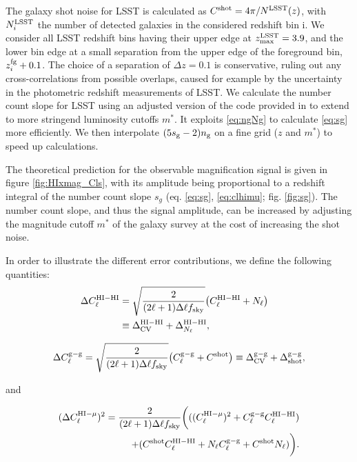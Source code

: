 \documentclass[useAMS,usenatbib]{mnras}
\newcommand{\be}{\begin{equation}}
\newcommand{\ee}{\end{equation}}
\begin{document}
The galaxy shot noise for LSST is calculated as $C^\mathrm{shot} = 4\pi/N^{\rm LSST}(z)$, with $N^{\rm LSST}_i$ the number of detected galaxies in the considered redshift bin i. We consider all LSST redshift bins having their upper edge at $z_{\rm max}^{\rm LSST} = 3.9$, and the lower bin edge at a small separation from the upper edge of the foreground bin, $z^{\rm fg}_i + 0.1$. The choice of a separation of $\Delta z = 0.1$ is conservative, ruling out any cross-correlations from possible overlaps, caused for example by the uncertainty in the photometric redshift measurements of LSST. We calculate the number count slope for LSST using an adjusted version of the code provided in \cite{0004-637X-814-2-145} to extend to more stringend luminosity cutoffs $m^*$. It exploits \ref{eq:ngNg} to calculate \ref{eq:sg} more efficiently.
We then interpolate $(5s_{\rm g}-2)n_{\rm g}$ on a fine grid ($z$ and $m^*$) to speed up calculations.


The theoretical prediction for the observable magnification signal is given in figure \ref{fig:HIxmag_Cls}, with its amplitude being proportional to a redshift integral of the number count slope $s_g$ (eq. \ref{eq:sg}, \ref{eq:clhimu}; fig. \ref{fig:sg}). The number count slope, and thus the signal amplitude, can be increased by adjusting the magnitude cutoff $m^*$ of the galaxy survey at the cost of increasing the shot noise.


In order to illustrate the different error contributions, we define the following quantities:
\begin{align}
\Delta C_\ell^{\rm HI-HI} &= \sqrt{\frac{2}{(2\ell+1)\Delta\ell f_{\rm sky}}} \bigl( C_\ell^{\rm HI-HI} + N_\ell \bigr)& \nonumber \\ &\equiv \Delta_{\rm CV}^{\rm HI-HI} + \Delta_{N_\ell}^{\rm HI-HI},&
\label{eq:deltah-h}
\end{align}

\be
\Delta C_\ell^{\rm g-g} = \sqrt{\frac{2}{(2\ell+1)\Delta\ell f_{\rm sky}}} \bigl( C_\ell^{\rm g-g}+ C^{\rm shot} \bigr) \equiv \Delta_{\rm CV}^{\rm g-g} + \Delta_{\rm shot}^{\rm g-g},
\label{eq:deltag-g}
\ee

and


\begin{align}
  (\Delta C_\ell^{{\rm HI-}\mu})^2 = \frac{2}{ (2\ell+1)\Delta\ell f_{\rm sky}} \biggl(   ((C_\ell^{{\rm HI-}\mu})^2  + C_\ell^{\rm g-g}C_\ell^{\rm HI-HI} ) \nonumber \\
  + ( C^{\rm shot}C_\ell^{\rm HI-HI} + N_\ell C_\ell^{\rm g-g} +  C^{\rm shot}N_\ell)  \biggr).
  \label{eq:deltah-mu}
\end{align}
\end{document}
